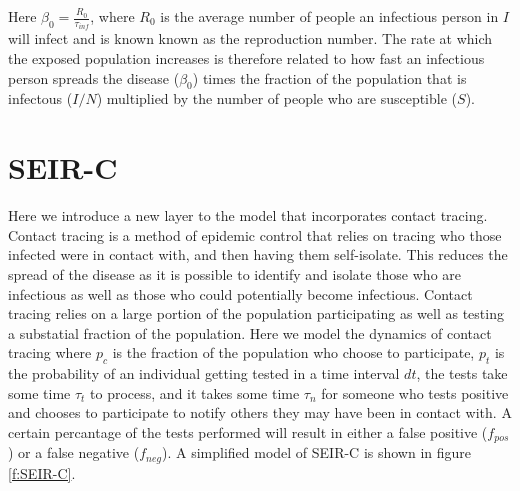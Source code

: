 \documentclass[notitlepage, superscriptaddress]{revtex4-2}
\begin{document}
Here $\beta_0 = \frac{R_{0}}{\tau_{inf}}$, where $R_{0}$ is the average number of people an infectious person in $I$ will infect and is known known as the reproduction number. The rate at which the exposed population increases is therefore related to how fast an infectious person spreads the disease ($\beta_{0}$) times the fraction of the population that is infectous ($I/N$) multiplied by the number of people who are susceptible ($S$).

\section{SEIR-C}
Here we introduce a new layer to the model that incorporates contact tracing. Contact tracing is a method of epidemic control that relies on tracing who those infected were in contact with, and then having them self-isolate. This reduces the spread of the disease as it is possible to identify and isolate those who are infectious as well as those who could potentially become infectious. Contact tracing relies on a large portion of the population participating as well as testing a substatial fraction of the population. Here we model the dynamics of contact tracing where $p_{c}$ is the fraction of the population who choose to participate, $p_t$ is the probability of an individual getting tested in a time interval $dt$, the tests take some time $\tau_{t}$ to process, and it takes some time $\tau_{n}$ for someone who tests positive and chooses to participate to notify others they may have been in contact with. A certain percantage of the tests performed will result in either a false positive ($f_{pos}$) or a false negative ($f_{neg}$). A simplified model of SEIR-C is shown in figure \ref{f:SEIR-C}.
\end{document}

